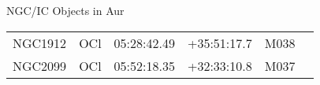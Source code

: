 \begin{block}{NGC/IC Objects in Aur}
  \centering
  \begin{tabularx}{\textwidth}{llrrll} 
    NGC1912 & OCl & 05:28:42.49 & +35:51:17.7  & M038 \\ 
    NGC2099 & OCl & 05:52:18.35 & +32:33:10.8  & M037 \\ 
  \end{tabularx}
\end{block}